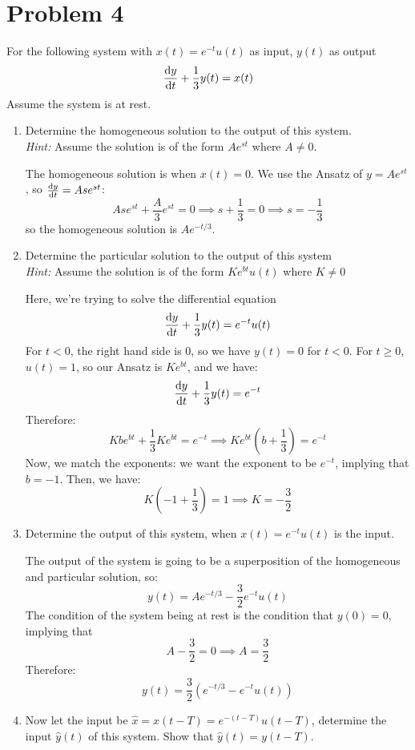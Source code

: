 \documentclass[10pt]{article}
\begin{document}
	\section*{Problem 4}
	For the following system with \( x(t) = e^{-t}u(t) \) as input, \( y(t)  \) as output
	\[
		\dv{y}{t} + \frac{1}{3}y(t) = x(t)
	\] 
	Assume the system is at rest.
	\begin{enumerate}[label=\alph*)]
		\item Determine the homogeneous solution to the output of this system. \\
			\textit{Hint:} Assume the solution is of the form \( Ae^{st} \) where \( A \neq 0 \). 

			\begin{solution}
				The homogeneous solution is when \( x(t) = 0 \). 
				We use the Ansatz of \(y =  Ae^{st} \), so \( \dv{y}{t} = Ase^{st} \):
				\[
					Ase^{st} + \frac{A}{3}e^{st} = 0 \implies s + \frac{1}{3} = 0 \implies s = -\frac{1}{3}
				\] 
				so the homogeneous solution is \( Ae^{-t / 3} \).
			\end{solution}
		\item Determine the particular solution to the output of this system\\
			\textit{Hint:} Assume the solution is of the form \( Ke^{bt}u(t)  \) where \( K \neq 0 \)

			\begin{solution}
				Here, we're trying to solve the differential equation 
				\[
					\dv{y}{t} + \frac{1}{3}y(t) = e^{-t}u(t)
				\] 
				For \( t < 0 \), the right hand side is 0, so we have \( y(t) = 0 \) for \( t < 0 \). For \( t \ge 0 \), 
				\( u(t) = 1 \), so our Ansatz is \( Ke^{bt} \), and we have:
				\[
					\dv{y}{t} + \frac{1}{3}y(t) = e^{-t}
				\] 
				Therefore: 
				\[
				Kbe^{bt} +\frac{1}{3}Ke^{bt} = e^{-t} \implies Ke^{bt}\left(b + \frac{1}{3}\right) = e^{-t}
				\] 
				Now, we match the exponents: we want the exponent to be \( e^{-t} \), implying that \( b = -1 \). 
				Then, we have:
				\[
				K\left( -1 + \frac{1}{3} \right) = 1\implies K = -\frac{3}{2}
				\]  
			\end{solution}
		\item Determine the output of this system, when \( x(t) = e^{-t}u(t) \) is the input. 
			
			\begin{solution}
				The output of the system is going to be a superposition of the homogeneous and particular solution, 
				so:
				\[
				y(t) = Ae^{-t / 3} - \frac{3}{2}e^{-t}u(t)
				\] 
				The condition of the system being at rest is the condition that \( y(0) = 0 \), implying that 
				\[
				A - \frac{3}{2} = 0 \implies A = \frac{3}{2}
				\] 
				Therefore: 
				\[
				y(t) = \frac{3}{2}\left( e^{-t / 3} - e^{-t}u(t) \right) 
				\] 
			\end{solution}
		\item Now let the input be \( \hat{x} = x(t - T) = e^{-(t - T)}u(t - T) \), determine the input 
			\( \hat{y}(t) \) of this system. Show that \( \hat{y}(t) = y(t- T) \). 


\end{enumerate}
\end{document}
